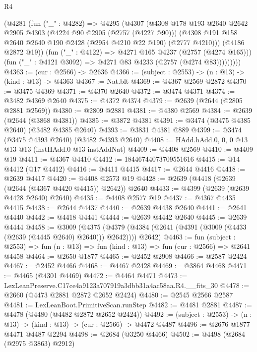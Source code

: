 \begin{lexlean}{R4}
\begin{coremodule}
            (@4281
              (fun ("_" : @4282) =>
              @4295
                (@4307
                  (@4308
                    @178
                    @193
                    @2640
                    @2642
                    @2905
                    @4303
                    (@4224 @90 @2905 (@2757 (@4227 @90)))
                    (@4308 @191 @158 @2640 @2640 @190 @2428 (@2954 @4210 @22 @190) (@2777 @4210)))
                  (@4186 @2872 @19))
                (fun ("_" : @4122) => @4271 @165 @4237 (@2757 (@4274 @165)))
                (fun ("_" : @4121 @3092) => @4271 @83 @4233 (@2757 (@4274 @83)))))))))
@4363 := (cur : @2566) -> @2636
@4366 := (subject : @2553) -> (n : @13) -> (kind : @13) -> @4363
@4367 := Nat.blt
@4369 := @4367 @2569 @2872
@4370 := @3475 @4369
@4371 := @4370 @2640
@4372 := @3474 @4371
@4374 := @3482 @4369 @2640
@4375 := @4372 @4374
@4379 := @2639 (@2644 (@2805 @2881 @2569))
@4380 := @2809 @2881
@4381 := @4380 @2569
@4384 := @2639 (@2644 (@3868 @4381))
@4385 := @3872 @4381
@4391 := @3474 (@3475 @4385 @2640) (@3482 @4385 @2640)
@4393 := @3831 @4381 @889
@4399 := @3474 (@3475 @4393 @2640) (@3482 @4393 @2640)
@4408 := HAdd.hAdd.{0, 0, 0} @13 @13 @13 (instHAdd.{0} @13 instAddNat)
@4409 := @4408 @2569
@4410 := @4409 @19
@4411 := @4367 @4410
@4412 := 18446744073709551616
@4415 := @14 @4412 (@17 @4412)
@4416 := @4411 @4415
@4417 := @2644 @4416
@4418 := @2639 @4417
@4420 := @4408 @2573 @19
@4428 := @2639 (@4418 (@2639 (@2644 (@4367 @4420 @4415)) @2642)) @2640
@4433 := @4399 (@2639 (@2639 @4428 @2640) @2640)
@4435 := @4408 @2577 @19
@4437 := @4367 @4435 @4415
@4438 := @2644 @4437
@4440 := @2639 @4438 @2640
@4441 := @2641 @4440
@4442 := @4418 @4441
@4444 := @2639 @4442 @2640
@4445 := @2639 @4444
@4458 := @3009
    (@4375 (@4379 (@4384 (@2641 (@4391 (@3009 (@4433 (@2639 (@4445 @2640) @2640))) @2642)))) @2642)
@4463 := fun (subject : @2553) =>
  fun (n : @13) => fun (kind : @13) => fun (cur : @2566) => @2641 @4458
@4464 := @2650 @1877
@4465 := @2452 @2908
@4466 := @2587 @2424
@4467 := @2452 @4466
@4468 := @4467 @2428
@4469 := @3864 @4468
@4471 := @4465 (@4301 @4469)
@4472 := @4464 @4471
@4473 := LexLeanPreserve.C17ce4a9123a707919a3dbb31a4ac58aa.R4.__fits_30
@4478 := @2660 (@4473 @2881 @2872 @2652 @2424)
@4480 := @2545 @2566 @2587
@4481 := LexLeanBoot.PrimitiveScan.runStep
@4482 := @4481 @2881
@4487 := @4478 (@4480 (@4482 @2872 @2652 @2424))
@4492 := (subject : @2553) -> (n : @13) -> (kind : @13) -> (cur : @2566) -> @4472 @4487
@4496 := @2676 @1877 @4471 @4487 @2294
@4498 := @2684 (@3250 @4466)
@4502 := @4498 (@2684 (@2975 @3863) @2912)

\end{coremodule}
\end{lexlean}
